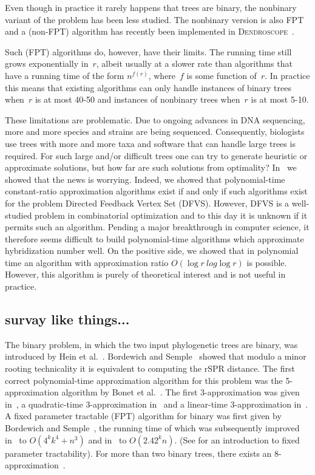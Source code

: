 {Even though in practice it rarely happens that trees are binary, the nonbinary variant of the problem has been less studied. The nonbinary version is also FPT \cite{linzsemple2009,terminusest} and a (non-FPT) algorithm has recently been implemented in \textsc{Dendroscope}~\cite{Dendroscope3}.

Such (FPT) algorithms do, however, have their limits. The running time still grows exponentially in~$r$, albeit usually at a slower rate than algorithms that have a running time of the form $n^{f(r)}$, where~$f$ is some function of~$r$. In practice this means that existing algorithms can only handle instances of binary trees when~$r$ is at most 40-50 and instances of nonbinary trees when~$r$ is at most 5-10.

These limitations are problematic. Due to ongoing advances in DNA sequencing, more and more species and strains are being sequenced. Consequently, biologists use trees with more and more taxa and software that can handle large trees is required. For such large and/or difficult trees one can try to generate heuristic or approximate solutions, but how far are such solutions from optimality? In~\cite{cyclekiller} we showed that the news is worrying. Indeed, we showed that polynomial-time constant-ratio approximation algorithms exist if and only if such algorithms exist for the problem Directed Feedback Vertex Set (DFVS). However, DFVS is a well-studied problem in combinatorial optimization and to this day it is unknown if it permits such an algorithm. Pending a major breakthrough in computer science, it therefore seems difficult to build polynomial-time algorithms which approximate hybridization number well. On the positive side, we showed that in polynomial time an algorithm with approximation ratio $O(\log r \
log \log r)$ is possible. However, this algorithm is purely of theoretical interest and is not useful in practice.






\subsection{survay like things...}
The binary \maf problem, in which the two input phylogenetic trees are binary, was introduced by Hein et al.~\cite{hein96}. Bordewich and Semple~\cite{BS05} showed that modulo a minor rooting technicality it is equivalent to computing the rSPR distance. The first correct polynomial-time approximation algorithm for this problem was the 5-approximation algorithm by Bonet et al.~\cite{bonet}. The first 3-approximation was given in~\cite{rsprFPT}, a quadratic-time 3-approximation in~\cite{3approxRSPR} and a linear-time 3-approximation in~\cite{whiddenFixed}. A fixed parameter tractable (FPT) algorithm for binary \maf was first given by Bordewich and Semple~\cite{BS05}, the running time of which was subsequently improved in~\cite{rsprFPT} to $O(4^kk^4+n^3)$ and in~\cite{whiddenFixed} to $O(2.42^kn)$. (See \cite{Flum2006,niedermeier2006} for an introduction to fixed parameter tractability). For more than two binary trees, there exists an 8-approximation~\cite{chataigner}.


}

